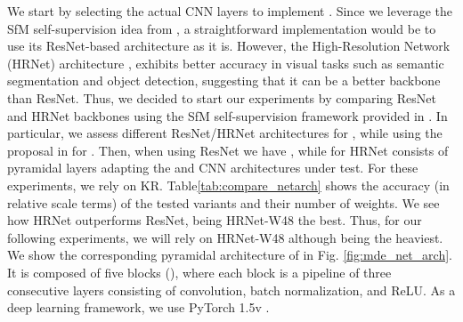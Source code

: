 \documentclass[journal]{IEEEtran}
\newcommand{\Fig}[1]{Fig. \ref{fig:#1}}
\begin{document}
We start by selecting the actual CNN layers to implement . Since we leverage the SfM self-supervision idea from \cite{Godard:2019MonoDepth2}, a straightforward implementation would be to use its ResNet-based architecture as it is. However, the High-Resolution Network (HRNet) architecture \cite{Wang:2020HrNet}, exhibits better accuracy in visual tasks such as semantic segmentation and object detection, suggesting that it can be a better backbone than ResNet. Thus, we decided to start our experiments by comparing ResNet and HRNet backbones using the SfM self-supervision framework provided in \cite{Godard:2019MonoDepth2}. In particular, we assess different ResNet/HRNet architectures for , while using the proposal in \cite{Godard:2019MonoDepth2} for . Then, when using ResNet we have , while for HRNet  consists of pyramidal layers adapting the  and  CNN architectures under test. For these experiments, we rely on KR. Table\ref{tab:compare_netarch} shows the accuracy (in relative scale terms) of the tested variants and their number of weights. We see how HRNet outperforms ResNet, being HRNet-W48 the best. Thus, for our following experiments, we will rely on HRNet-W48 although being the heaviest. We show the corresponding pyramidal architecture of  in \Fig{mde_net_arch}. It is composed of five blocks (), where each block is a pipeline of three consecutive layers consisting of convolution, batch normalization, and ReLU. As a deep learning framework, we use PyTorch 1.5v \cite{Paszke:2019pytorch}.
\end{document}
